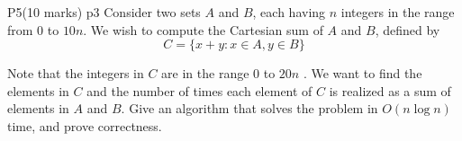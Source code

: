 \documentclass[a4paper, 11pt]{article}
\begin{document}

\begin{problem}{%
		P5\hfill  (10 marks)
	}{p3%
	}
Consider two sets $A$ and $B$, each having $n$ integers in the range from 0 to $10 n$. We wish to compute the Cartesian sum of $A$ and $B$, defined by
$$
C=\{x+y\colon x \in A, y \in B\}
$$

Note that the integers in $C$ are in the range $0$ to $20n$ . We want to find the elements in $C$ and the number of times each element of $C$ is realized as a sum of elements in $A$ and $B$. Give an algorithm that solves the problem in $O(n \log n)$ time, and prove correctness.

\end{problem}
\end{document}
